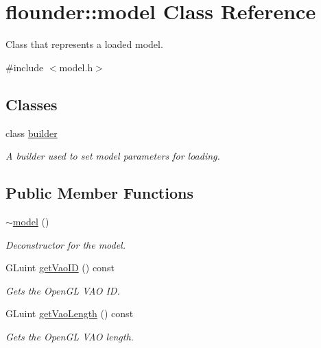 \hypertarget{classflounder_1_1model}{}\section{flounder\+:\+:model Class Reference}
\label{classflounder_1_1model}


Class that represents a loaded model.  




{\ttfamily \#include $<$model.\+h$>$}

\subsection*{Classes}
\begin{DoxyCompactItemize}
\item 
class \hyperlink{classflounder_1_1model_1_1builder}{builder}
\begin{DoxyCompactList}\small\item\em A builder used to set model parameters for loading. \end{DoxyCompactList}\end{DoxyCompactItemize}
\subsection*{Public Member Functions}
\begin{DoxyCompactItemize}
\item 
\hyperlink{classflounder_1_1model_afd864365f858cc9bc0bf260bb6212a76}{$\sim$model} ()
\begin{DoxyCompactList}\small\item\em Deconstructor for the model. \end{DoxyCompactList}\item 
G\+Luint \hyperlink{classflounder_1_1model_a6c228ad9bf9ae4897cc3b4a40be8e65e}{get\+Vao\+ID} () const
\begin{DoxyCompactList}\small\item\em Gets the Open\+GL V\+AO ID. \end{DoxyCompactList}\item 
G\+Luint \hyperlink{classflounder_1_1model_a224a933a01c0b0c73c7ce2876a519394}{get\+Vao\+Length} () const
\begin{DoxyCompactList}\small\item\em Gets the Open\+GL V\+AO length. \end{DoxyCompactList}\end{DoxyCompactItemize}
